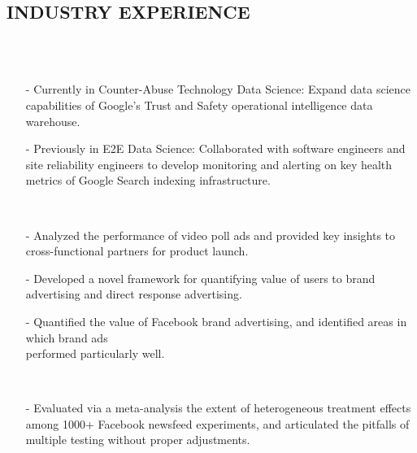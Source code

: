 \documentclass{res}
\begin{document}
\begin{resume}
\section{INDUSTRY EXPERIENCE}

     \\ 
     \\ 
            \begin{itemize}\setlength\itemsep{0em}
        \item[-] Currently in Counter-Abuse Technology Data Science: Expand data science capabilities of Google's Trust and Safety operational intelligence data warehouse.
        \item[-] Previously in E2E Data Science: Collaborated with software engineers and site reliability engineers to develop monitoring and alerting on key health metrics of Google Search indexing infrastructure.
        \end{itemize}

     \\ 
            \begin{itemize}\setlength\itemsep{0em}
        \item[-] Analyzed the performance of video poll ads and provided key insights to cross-functional partners for product launch. 
\item[-]  Developed a novel framework for quantifying value of users to brand advertising and direct response advertising.
\item[-] Quantified the value of Facebook brand advertising, and identified areas in which brand ads\\ performed particularly well. 
        \end{itemize}

     \\ 
            \begin{itemize}\setlength\itemsep{0em}
        \item[-] Evaluated via a meta-analysis the extent of heterogeneous treatment effects among 1000+ Facebook newsfeed experiments, and articulated the pitfalls of multiple testing without proper adjustments.
        \end{itemize}
  

\end{resume}
\end{document}
